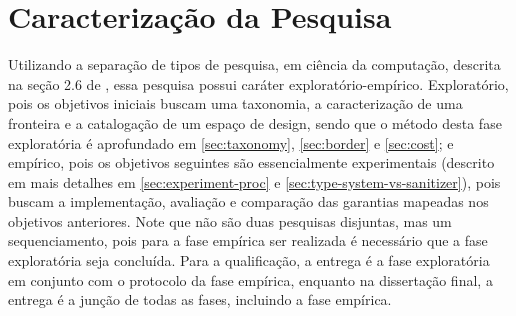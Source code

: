 

\section{Caracterização da Pesquisa}
\label{sec:research-kind}

Utilizando a separação de tipos de pesquisa, em ciência da computação, descrita na seção 2.6 de \citep{wazlawick2009metodologia}, essa pesquisa possui caráter exploratório-empírico. Exploratório, pois os objetivos iniciais buscam uma taxonomia, a caracterização de uma fronteira e a catalogação de um espaço de design, sendo que o método desta fase exploratória é aprofundado em \ref{sec:taxonomy}, \ref{sec:border} e \ref{sec:cost}; e empírico, pois os objetivos seguintes são essencialmente experimentais (descrito em mais detalhes em \ref{sec:experiment-proc} e \ref{sec:type-system-vs-sanitizer}), pois buscam a implementação, avaliação e comparação das garantias mapeadas nos objetivos anteriores. Note que não são duas pesquisas disjuntas, mas um sequenciamento, pois para a fase empírica ser realizada é necessário que a fase exploratória seja concluída. Para a qualificação, a entrega é a fase exploratória em conjunto com o protocolo da fase empírica, enquanto na dissertação final, a entrega é a junção de todas as fases, incluindo a fase empírica.

